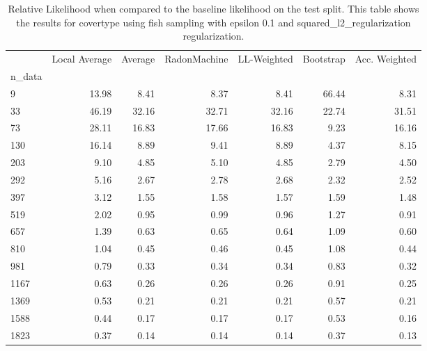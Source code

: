 \begin{table}
\centering
\caption{Relative Likelihood when compared to the baseline likelihood on the test split. This table shows the results for  covertype using  fish sampling with epsilon  0.1 and  squared_l2_regularization regularization.}
\label{tab:5}
\begin{tabular}{lrrrrrr}
\toprule
{} &  Local Average &  Average &  RadonMachine &  LL-Weighted &  Bootstrap &  Acc. Weighted \\
n\_data &                &          &               &              &            &                \\
\midrule
9      &          13.98 &     8.41 &          8.37 &         8.41 &      66.44 &           8.31 \\
33     &          46.19 &    32.16 &         32.71 &        32.16 &      22.74 &          31.51 \\
73     &          28.11 &    16.83 &         17.66 &        16.83 &       9.23 &          16.16 \\
130    &          16.14 &     8.89 &          9.41 &         8.89 &       4.37 &           8.15 \\
203    &           9.10 &     4.85 &          5.10 &         4.85 &       2.79 &           4.50 \\
292    &           5.16 &     2.67 &          2.78 &         2.68 &       2.32 &           2.52 \\
397    &           3.12 &     1.55 &          1.58 &         1.57 &       1.59 &           1.48 \\
519    &           2.02 &     0.95 &          0.99 &         0.96 &       1.27 &           0.91 \\
657    &           1.39 &     0.63 &          0.65 &         0.64 &       1.09 &           0.60 \\
810    &           1.04 &     0.45 &          0.46 &         0.45 &       1.08 &           0.44 \\
981    &           0.79 &     0.33 &          0.34 &         0.34 &       0.83 &           0.32 \\
1167   &           0.63 &     0.26 &          0.26 &         0.26 &       0.91 &           0.25 \\
1369   &           0.53 &     0.21 &          0.21 &         0.21 &       0.57 &           0.21 \\
1588   &           0.44 &     0.17 &          0.17 &         0.17 &       0.53 &           0.16 \\
1823   &           0.37 &     0.14 &          0.14 &         0.14 &       0.37 &           0.13 \\
\bottomrule
\end{tabular}
\end{table}
